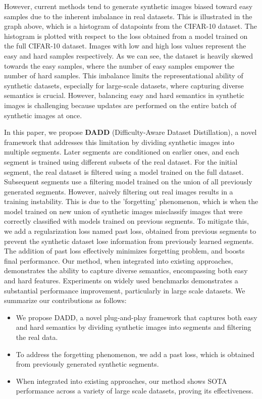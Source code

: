 \documentclass{article}
\theoremstyle{plain}
\theoremstyle{definition}
\theoremstyle{remark}
\begin{document}
However, current methods tend to generate synthetic images biased toward easy samples due to the inherent imbalance in real datasets. This is illustrated in the graph above, which is a histogram of datapoints from the CIFAR-10 dataset. The histogram is plotted with respect to the loss obtained from a model trained on the full CIFAR-10 dataset. Images with low and high loss values represent the easy and hard samples respectively. As we can see, the dataset is heavily skewed towards the easy samples, where the number of easy samples empower the number of hard samples. This imbalance limits the representational ability of synthetic datasets, especially for large-scale datasets, where capturing diverse semantics is crucial. However, balancing easy and hard semantics in synthetic images is challenging because updates are performed on the entire batch of synthetic images at once.

In this paper, we propose \textbf{DADD} (Difficulty-Aware Dataset Distillation), a novel framework that addresses this limitation by dividing synthetic images into multiple segments. Later segments are conditioned on earlier ones, and each segment is trained using different subsets of the real dataset. For the initial segment, the real dataset is filtered using a model trained on the full dataset. Subsequent segments use a filtering model trained on the union of all previously generated segments. However, naively filtering out real images results in a training instability. This is due to the 'forgetting' phenomenon, which is when the model trained on new union of synthetic images misclassify images that were correctly classified with models trained on previous segments. To mitigate this, we add a regularization loss named past loss, obtained from previous segments to prevent the synthetic dataset lose information from previously learned segments. The addition of past loss effectively minimizes forgetting problem, and boosts final performance. Our method, when integrated into existing approaches, demonstrates the ability to capture diverse semantics, encompassing both easy and hard features. Experiments on widely used benchmarks demonstrates a substantial performance improvement, particularly in large scale datasets. We summarize our contributions as follows:
\begin{itemize}
    \item We propose DADD, a novel plug-and-play framework that captures both easy and hard semantics by dividing synthetic images into segments and filtering the real data.
    \item To address the forgetting phenomenon, we add a past loss, which is obtained from previously generated synthetic segments.
    \item When integrated into existing approaches, our method shows SOTA performance across a variety of large scale datasets, proving its effectiveness.
\end{itemize}
\end{document}
